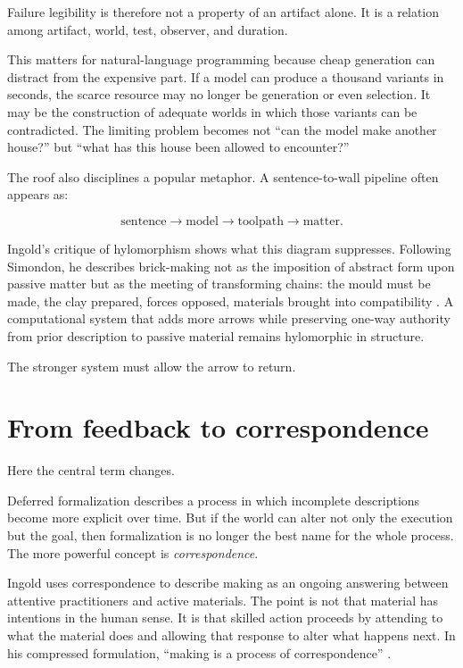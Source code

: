 \documentclass[11pt]{article}
\begin{document}
Failure legibility is therefore not a property of an artifact alone. It is a relation among artifact, world, test, observer, and duration.

This matters for natural-language programming because cheap generation can distract from the expensive part. If a model can produce a thousand variants in seconds, the scarce resource may no longer be generation or even selection. It may be the construction of adequate worlds in which those variants can be contradicted. The limiting problem becomes not ``can the model make another house?'' but ``what has this house been allowed to encounter?''

The roof also disciplines a popular metaphor. A sentence-to-wall pipeline often appears as:

\[
\text{sentence} \rightarrow \text{model} \rightarrow \text{toolpath} \rightarrow \text{matter}.
\]

Ingold's critique of hylomorphism shows what this diagram suppresses. Following Simondon, he describes brick-making not as the imposition of abstract form upon passive matter but as the meeting of transforming chains: the mould must be made, the clay prepared, forces opposed, materials brought into compatibility \citep[25--26]{ingold2013making}. A computational system that adds more arrows while preserving one-way authority from prior description to passive material remains hylomorphic in structure.

The stronger system must allow the arrow to return.

\section{From feedback to correspondence}

Here the central term changes.

Deferred formalization describes a process in which incomplete descriptions become more explicit over time. But if the world can alter not only the execution but the goal, then formalization is no longer the best name for the whole process. The more powerful concept is \emph{correspondence}.

Ingold uses correspondence to describe making as an ongoing answering between attentive practitioners and active materials. The point is not that material has intentions in the human sense. It is that skilled action proceeds by attending to what the material does and allowing that response to alter what happens next. In his compressed formulation, ``making is a process of correspondence'' \citep[31]{ingold2013making}.
\end{document}
